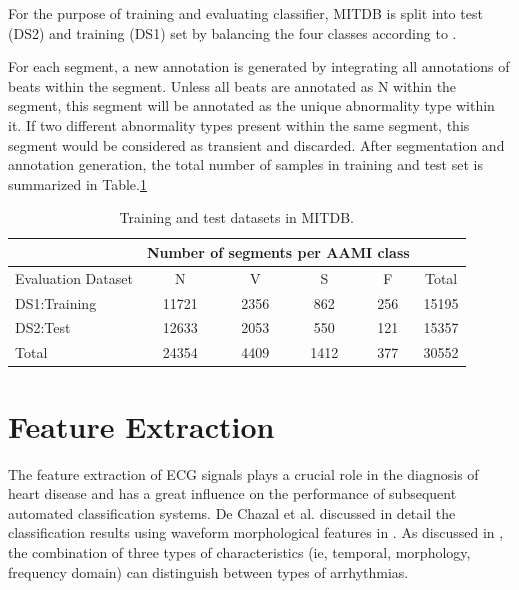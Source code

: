 
For the purpose of training and evaluating classifier, MITDB is split into test (DS2) and training (DS1) set by balancing the four classes according to \cite{autofs}. 

For each segment, a new annotation is generated by integrating all annotations of beats within the segment. Unless all beats are annotated as N within the segment, this segment will be annotated as the unique abnormality type within it. If two different abnormality types present within the same segment, this segment would be considered as transient and discarded. After segmentation and annotation generation, the total number of samples in training and test set is summarized in Table.\ref{table:ds}
\begin{table}[b]
	\centering
	\caption{Training and test datasets in MITDB.}
	\vspace{-0.05in}
	\begin{tabular}{|l|c|c|c|c|c|}
		\hline 
		& \multicolumn{4}{c}{Number of segments per AAMI class} &\\ 
		\hline 
		Evaluation Dataset& N & V & S & F &Total \\ 
		\hline 
		DS1:Training & 11721& 2356 & 862 & 256 & 15195\\ 
		\hline 
		DS2:Test & 12633 & 2053 & 550 & 121 & 15357 \\ 
		\hline 
		Total & 24354 & 4409 & 1412 & 377 & 30552 \\ 
		\hline 
	\end{tabular}
	\label{table:ds} 
	\vspace{-0.15in}
\end{table}

\section{Feature Extraction}

The feature extraction of ECG signals plays a crucial role in the diagnosis of heart disease and has a great influence on the performance of subsequent automated classification systems. De Chazal et al. discussed in detail the classification results using waveform morphological features in \cite{autofs}. As discussed in \cite{jambukia2015classification}, the combination of three types of characteristics (ie, temporal, morphology, frequency domain) can distinguish between types of arrhythmias. 


